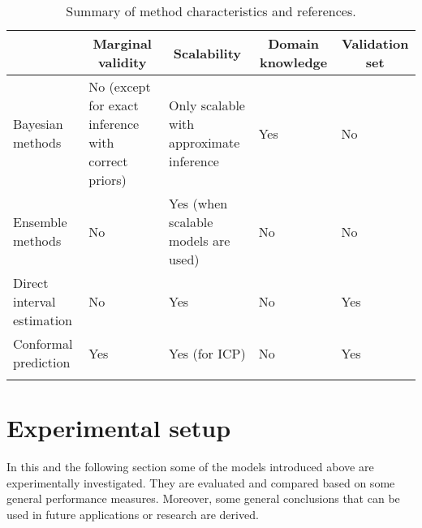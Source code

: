 \documentclass[smallcondensed]{svjour3}
\begin{document}
    \begin{table}[ht!]
        \centering
        \renewcommand{\arraystretch}{1.5}
        \begin{tabularx}{\linewidth}{|X||X|X|X|X|}
            \firsthline
            \multicolumn{1}{|c||}{Method}&\multicolumn{1}{c|}{Marginal validity}&\multicolumn{1}{c|}{Scalability}&\multicolumn{1}{c|}{Domain knowledge}&\multicolumn{1}{c|}{Validation set}\\
            \hline
            Bayesian methods\newline\cite{blei2017variational,blundell2015weight,goan2020bayesian,hensman2015scalable,williams1996gaussian,wilson2015kernel}&
            No (except for exact inference with correct priors)&
            Only scalable with approximate inference&
            Yes&
            No\\
            \hline
            Ensemble methods\newline\cite{heskes1997practical,kendallgal,lakshminarayanan2017simple,meinshausen2006quantile,nix1994estimating,wager2014confidence}&
            No&
            Yes (when scalable models are used)&
            No&
            No\\
            \hline
            Direct interval estimation\newline\cite{koenker2001quantile,pearce2020uncertainty}&
            No&
            Yes&
            No&
            Yes\\
            \hline
            Conformal prediction\newline\cite{barber2021predictive,sesia2020comparison,vovk2015cross,cp_all}&
            Yes&
            Yes (for ICP)&
            No&
            Yes\\
            \lasthline
        \end{tabularx}
        \caption{Summary of method characteristics and references.}
        \label{table:method_summary}
    \end{table}

\section{Experimental setup}\label{section:methodology}

    In this and the following section some of the models introduced above are experimentally investigated. They are evaluated and compared based on some general performance measures. Moreover, some general conclusions that can be used in future applications or research are derived.
\end{document}
